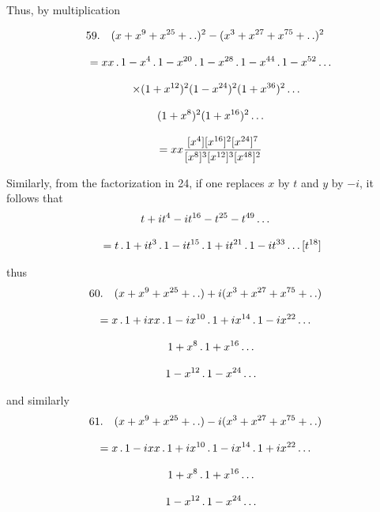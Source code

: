 \begingroup
\renewcommand{\arraystretch}{1.45}

Thus, by multiplication

\[
\begin{gathered}
59.\quad{}
(x+x^9+x^{25}+ .\,. )^2-(x^3+x^{27}+x^{75}+ .\,. )^2\\[8pt]
\quad=xx\,.\,1-x^4\,.\,1-x^{20}\,.\,1-x^{28}\,.\,1-x^{44}\,.\,1-x^{52}\mathinner{.\,.\,.}\\[8pt]
\qquad\times(1+x^{12})^2(1-x^{24})^2(1+x^{36})^2\mathinner{.\,.\,.}\\[8pt]\quad{}(1+x^8)^2(1+x^{16})^2\mathinner{.\,.\,.}\\[8pt]
\quad=xx\frac{[x^4][x^{16}]^2[x^{24}]^7}{[x^8]^3[x^{12}]^3[x^{48}]^2}
\end{gathered}
\]


Similarly, from the factorization in 24, if one replaces \(x\) by \(t\) and
\(y\) by \(-i\), it follows that
\[
\begin{gathered}t+it^4-it^{16}-t^{25}-t^{49}\mathinner{.\,.\,.}\\[8pt]\quad{}=t\,.\,1+it^3\,.\,1-it^{15}\,.\,1+it^{21}\,.\,1-it^{33}\mathinner{.\,.\,.}[t^{18}]\end{gathered}
\]

thus
\[
\begin{gathered}
60.\quad{}
(x+x^9+x^{25}+\mathinner{.\,.})+i(x^3+x^{27}+x^{75}+\mathinner{.\,.})\\[8pt]
=x\,.\,1+ixx\,.\,1-ix^{10}\,.\,1+ix^{14}\,.\,1-ix^{22}\mathinner{.\,.\,.}\\[8pt]\quad{}1+x^8\,.\,1+x^{16}\mathinner{.\,.\,.}\\[8pt]\quad{}1-x^{12}\,.\,1-x^{24}\mathinner{.\,.\,.}
\end{gathered}
\]


and similarly
\[
\begin{gathered}
61.\quad{}
(x+x^9+x^{25}+\mathinner{.\,.})-i(x^3+x^{27}+x^{75}+\mathinner{.\,.})\\[8pt]
=x\,.\,1-ixx\,.\,1+ix^{10}\,.\,1-ix^{14}\,.\,1+ix^{22}\mathinner{.\,.\,.}\\[8pt]\quad{}1+x^8\,.\,1+x^{16}\mathinner{.\,.\,.}\\[8pt]\quad{}1-x^{12}\,.\,1-x^{24}\mathinner{.\,.\,.}
\end{gathered}
\]


